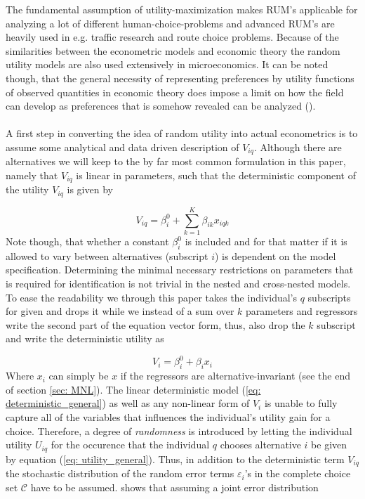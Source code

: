 The fundamental assumption of utility-maximization makes RUM's applicable for analyzing a lot of different human-choice-problems and advanced RUM's are heavily used in e.g. traffic research and route choice problems. Because of the similarities between the econometric models and economic theory the random utility models are also used extensively in microeconomics. It can be noted though, that the general necessity of representing preferences by utility functions of observed quantities in economic theory does impose a limit on how the field can develop as preferences that is somehow revealed can be analyzed (\cite{richter_revealed_1966}).
\\ \\
A first step in converting the idea of random utility into actual econometrics is to assume some analytical and data driven description of $V_{iq}$. Although there are alternatives we will keep to the by far most common formulation in this paper, namely that $V_{iq}$ is linear in parameters, such that the deterministic component of the utility $V_{iq}$ is given by

  \begin{equation*}
    V_{iq} = \beta_{i}^0 + \sum_{k=1}^K \beta_{ik} x_{iqk}
  \end{equation*}
Note though, that whether a constant $\beta_i^0$ is included and for that matter if it is allowed to vary between alternatives (subscript $i$) is dependent on the model specification. Determining the minimal necessary restrictions on parameters that is required for identification is not trivial in the nested and cross-nested models. To ease the readability we through this paper takes the individual's $q$ subscripts for given and drops it while we instead of a sum over $k$ parameters and regressors write the second part of the equation vector form, thus, also drop the $k$ subscript and write the deterministic utility as

  \begin{equation} \label{eq: deterministic_general}
    V_{i} = \beta_{i}^0 + \beta_{i}x_{i}
  \end{equation}
Where $x_i$ can simply be $x$ if the regressors are alternative-invariant (see the end of section \ref{sec: MNL}). The linear deterministic model (\ref{eq: deterministic_general}) as well as any non-linear form of $V_i$ is unable to fully capture all of the variables that influences the individual's utility gain for a choice. Therefore, a degree of \textit{randomness} is introduced by letting the individual utility $U_{iq}$ for the occurence that the individual $q$ chooses alternative $i$ be given by equation (\ref{eq: utility_general}).
Thus, in addition to the deterministic term $V_{iq}$ the stochastic distribution of the random error terms $\varepsilon_i$'s in the complete choice set $\mathcal{C}$ have to be assumed. \citet{mcfadden_modelling_1977} shows that assuming a joint error distribution

